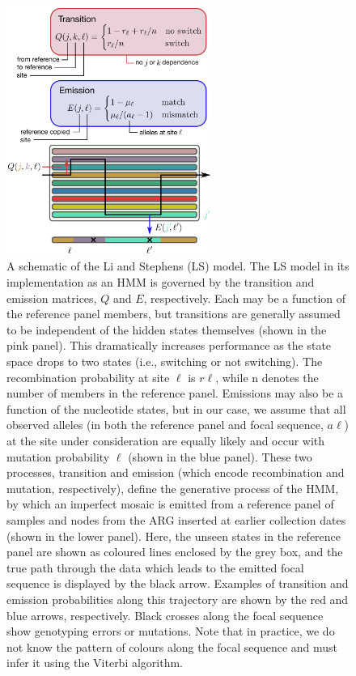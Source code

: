 \documentclass{article}
\begin{document}
\begin{figure} \centering
\includegraphics[width=0.6\textwidth]{figures/ls_diagram_covid.pdf}
\caption{\label{fig:ls_diagram} A schematic of the Li and Stephens (LS) model.
The LS model in its implementation as an HMM is governed by the transition and
emission matrices, $Q$ and $E$, respectively. Each may be a
function of the reference panel members, but transitions are generally assumed
to be independent of the hidden states themselves (shown in the pink panel).
This dramatically increases performance as the state space drops to two states
(i.e., switching or not switching). The recombination probability at site
$\ell$ is $r\ell$, while n denotes the number of members in the
reference panel. Emissions may also be a function of the nucleotide states, but
in our case, we assume that all observed alleles (in both the reference panel
and focal sequence, $a\ell$) at the site under consideration are equally
likely and occur with mutation probability $\ell$ (shown in the blue
panel). These two processes, transition and emission (which encode
recombination and mutation, respectively), define the generative process of the
HMM, by which an imperfect mosaic is emitted from a reference panel of samples
and nodes from the ARG inserted at earlier collection dates (shown in the lower
panel). Here, the unseen states in the reference panel are shown as coloured
lines enclosed by the grey box, and the true path through the data which leads
to the emitted focal sequence is displayed by the black arrow. Examples of
transition and emission probabilities along this trajectory are shown by the
red and blue arrows, respectively. Black crosses along the focal sequence show
genotyping errors or mutations. Note that in practice, we do not know the
pattern of colours along the focal sequence and must infer it using the Viterbi
algorithm.} \end{figure}
\end{document}
